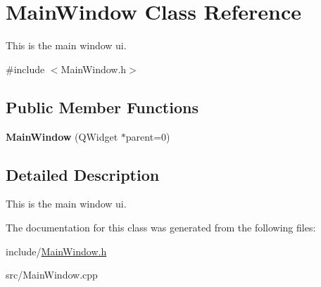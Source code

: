 \hypertarget{classMainWindow}{
\section{MainWindow Class Reference}
\label{classMainWindow}
}


This is the main window ui.  




{\ttfamily \#include $<$MainWindow.h$>$}

\subsection*{Public Member Functions}
\begin{DoxyCompactItemize}
\item 
\hypertarget{classMainWindow_a8b244be8b7b7db1b08de2a2acb9409db}{
{\bfseries MainWindow} (QWidget $\ast$parent=0)}
\label{classMainWindow_a8b244be8b7b7db1b08de2a2acb9409db}

\end{DoxyCompactItemize}


\subsection{Detailed Description}
This is the main window ui. 

The documentation for this class was generated from the following files:\begin{DoxyCompactItemize}
\item 
include/\hyperlink{MainWindow_8h}{MainWindow.h}\item 
src/MainWindow.cpp\end{DoxyCompactItemize}

